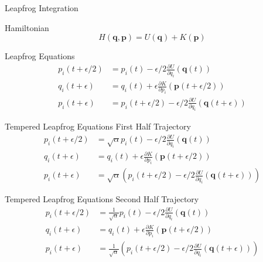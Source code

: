 \documentclass{beamer}
\begin{document}
\begin{frame}{Leapfrog Integration}
    {
    \begin{block}{Hamiltonian}
        \begin{equation*}
            \label{eq:HamiltonianUPlusK}
            H\left(\bm{q},\bm{p}\right) = U\left(\bm{q}\right) + K\left(\bm{p}\right)
        \end{equation*}
    \end{block}
    }
    {
    \begin{block}{Leapfrog Equations}
        \begin{align*}
                p_i\left(t+\epsilon/2\right) &  = p_i\left(t\right) - \epsilon/2\frac{\partial U}{\partial q_i}\left(\bm{q}\left(t\right)\right) \\
                q_i\left(t+\epsilon\right) &  = q_i\left(t\right) + \epsilon\frac{\partial K}{\partial p_i}\left(\bm{p}\left(t+\epsilon/2\right)\right) \\
                p_i\left(t+\epsilon\right) &  = p_i\left(t+\epsilon/2\right) - \epsilon/2\frac{\partial U}{\partial q_i}\left(\bm{q}\left(t+\epsilon\right)\right)
            \end{align*}
    \end{block}
    }
    {
        \begin{block}{Tempered Leapfrog Equations First Half Trajectory}
            \begin{align*}
                 p_i\left(t+\epsilon/2\right) & = \sqrt{\alpha}p_i\left(t\right) - \epsilon/2\frac{\partial U}{\partial q_i}\left(\bm{q}\left(t\right)\right) \\
                \label{eq:TLeapFrogEq2}q_i\left(t+\epsilon\right) & = q_i\left(t\right) + \epsilon\frac{\partial K}{\partial p_i}\left(\bm{p}\left(t+\epsilon/2\right)\right) \\
                \label{eq:TLeapFrogEq3}p_i\left(t+\epsilon\right) & = \sqrt{\alpha}\left(p_i\left(t+\epsilon/2\right) - \epsilon/2\frac{\partial U}{\partial q_i}\left(\bm{q}\left(t+\epsilon\right)\right)\right)
            \end{align*}
        \end{block}
    }
    {
        \begin{block}{Tempered Leapfrog Equations Second Half Trajectory}
            \begin{align*}
                p_i\left(t+\epsilon/2\right) & = \frac{1}{\sqrt{\alpha}}p_i\left(t\right) - \epsilon/2\frac{\partial U}{\partial q_i}\left(\bm{q}\left(t\right)\right) \\
                q_i\left(t+\epsilon\right) & = q_i\left(t\right) + \epsilon\frac{\partial K}{\partial p_i}\left(\bm{p}\left(t+\epsilon/2\right)\right) \\
                p_i\left(t+\epsilon\right) & = \frac{1}{\sqrt{\alpha}}\left(p_i\left(t+\epsilon/2\right) - \epsilon/2\frac{\partial U}{\partial q_i}\left(\bm{q}\left(t+\epsilon\right)\right)\right)
            \end{align*}
        \end{block}
    }



\end{frame}
\end{document}
